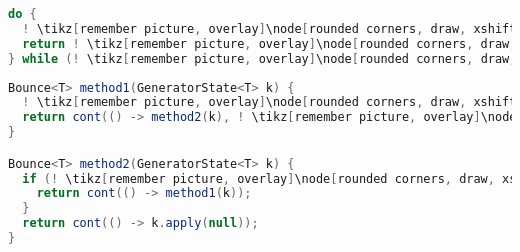 \begin{center}
\begin{mdframed}[topline=true]
\begin{minipage}[t]{0.4\textwidth}
\begin{lstlisting}[language=Java, numbers=none, breaklines=true]
do {
  ! \tikz[remember picture, overlay]\node[rounded corners, draw, xshift=-0.1cm, inner sep=5pt, anchor=west] {Kódrészlet}; \vspace*{0.5cm} ! 
  return ! \tikz[remember picture, overlay]\node[rounded corners, draw, xshift=-0.1cm, inner sep=5pt, anchor=west, yshift=0.1cm] {Kifejezés}; \vspace*{0.3cm} !
} while (! \tikz[remember picture, overlay]\node[rounded corners, draw, xshift=-0.1cm, inner sep=5pt, anchor=west, yshift=0.1cm] {Feltétel}; \vspace*{0.3cm} \hspace*{1.14cm}!);
\end{lstlisting}
\end{minipage} 
\begin{minipage}[t]{0.6\textwidth}
\begin{lstlisting}[language=Java, numbers=none, breaklines=true]
Bounce<T> method1(GeneratorState<T> k) {
  ! \tikz[remember picture, overlay]\node[rounded corners, draw, xshift=-0.1cm, inner sep=5pt, anchor=west] {Kódrészlet}; \vspace*{0.3cm} !
  return cont(() -> method2(k), ! \tikz[remember picture, overlay]\node[rounded corners, draw, xshift=-0.1cm, inner sep=5pt, anchor=west, yshift=0.1cm] {Kifejezés}; \vspace*{0.2cm} \hspace*{1.2cm} !);
}

Bounce<T> method2(GeneratorState<T> k) {
  if (! \tikz[remember picture, overlay]\node[rounded corners, draw, xshift=-0.1cm, inner sep=5pt, anchor=west, yshift=0.1cm] {Feltétel}; \hspace*{1.04cm} !) {
    return cont(() -> method1(k));
  }
  return cont(() -> k.apply(null));
}
\end{lstlisting} 
\end{minipage}
\end{mdframed}
\end{center}


\pagebreak

